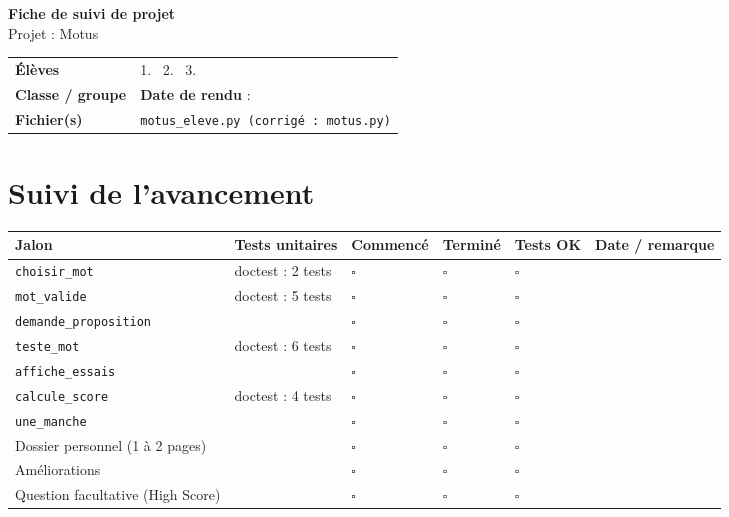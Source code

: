 \documentclass[10pt,a4paper]{article}
\begin{document}
\begin{center}
{\LARGE\bfseries\color{accent} Fiche de suivi de projet}\\[2mm]
{\Large Projet : Motus}
\end{center}

\medskip
\begin{tabularx}{\linewidth}{@{}l X@{}}
\textbf{Élèves} & 1. \dotfill\ 2. \dotfill\ 3. \dotfill \\[2mm]
\textbf{Classe / groupe} & \dotfill \hfill \textbf{Date de rendu} : \dotfill \\[2mm]
\textbf{Fichier(s)} & \texttt{motus\_eleve.py \quad (corrigé : motus.py)} \\
\end{tabularx}

\section*{Suivi de l'avancement}
\begin{tabularx}{\linewidth}{@{}X l C{1.2cm} C{1.2cm} C{1.2cm} l@{}}
\toprule
{} Jalon & Tests unitaires & Commencé & Terminé & Tests OK & Date / remarque \\
\midrule
\texttt{choisir\_\allowbreak{}mot} & doctest : 2 tests & $\square$ & $\square$ & $\square$ & \\
\texttt{mot\_\allowbreak{}valide} & doctest : 5 tests & $\square$ & $\square$ & $\square$ & \\
\texttt{demande\_\allowbreak{}proposition} &  & $\square$ & $\square$ & $\square$ & \\
\texttt{teste\_\allowbreak{}mot} & doctest : 6 tests & $\square$ & $\square$ & $\square$ & \\
\texttt{affiche\_\allowbreak{}essais} &  & $\square$ & $\square$ & $\square$ & \\
\texttt{calcule\_\allowbreak{}score} & doctest : 4 tests & $\square$ & $\square$ & $\square$ & \\
\texttt{une\_\allowbreak{}manche} &  & $\square$ & $\square$ & $\square$ & \\
Dossier personnel (1 à 2 pages) &  & $\square$ & $\square$ & $\square$ & \\
Améliorations &  & $\square$ & $\square$ & $\square$ & \\
Question facultative (High Score) &  & $\square$ & $\square$ & $\square$ & \\
\bottomrule
\end{tabularx}
\end{document}
